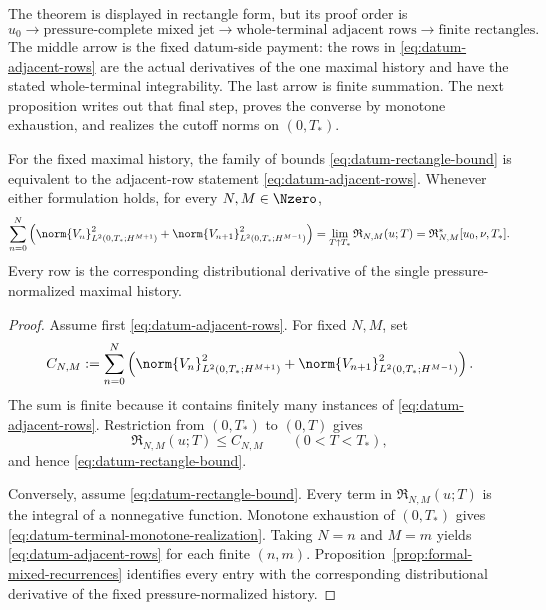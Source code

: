 The theorem is displayed in rectangle form, but its proof order is
\[
 u_0
 \longrightarrow \text{pressure-complete mixed jet}
 \longrightarrow \text{whole-terminal adjacent rows}
 \longrightarrow \text{finite rectangles}.
\]
The middle arrow is the fixed datum-side payment: the rows in
\eqref{eq:datum-adjacent-rows} are the actual derivatives of the one maximal
history and have the stated whole-terminal integrability.  The last arrow is
finite summation.  The next proposition writes out that final step, proves the
converse by monotone exhaustion, and realizes the cutoff norms on \((0,T_*)\).

\begin{proposition}
\label{prop:datum-terminal-realization}
For the fixed maximal history, the family of bounds
\eqref{eq:datum-rectangle-bound} is equivalent to the adjacent-row statement
\eqref{eq:datum-adjacent-rows}.  Whenever either formulation holds, for every
\(N,M\in\Nzero\),
\begin{equation}
 \sum_{n=0}^{N}\left(
 \norm{V_n}_{L^2(0,T_*;H^{M+1})}^2
 +\norm{V_{n+1}}_{L^2(0,T_*;H^{M-1})}^2
 \right)
 =\lim_{T\uparrow T_*}\mathfrak R_{N,M}(u;T)
 =\mathfrak R_{N,M}^*[u_0,\nu,T_*].
 \label{eq:datum-terminal-monotone-realization}
\end{equation}
Every row is the corresponding distributional derivative of the single
pressure-normalized maximal history.
\end{proposition}

\begin{proof}
Assume first \eqref{eq:datum-adjacent-rows}.  For fixed \(N,M\), set
\[
 C_{N,M}:=
 \sum_{n=0}^{N}\left(
  \norm{V_n}_{L^2(0,T_*;H^{M+1})}^2
  +\norm{V_{n+1}}_{L^2(0,T_*;H^{M-1})}^2
 \right).
\]
The sum is finite because it contains finitely many instances of
\eqref{eq:datum-adjacent-rows}.  Restriction from \((0,T_*)\) to \((0,T)\)
gives
\[
 \mathfrak R_{N,M}(u;T)\le C_{N,M}
 \qquad(0<T<T_*),
\]
and hence \eqref{eq:datum-rectangle-bound}.

Conversely, assume \eqref{eq:datum-rectangle-bound}.  Every term in
\(\mathfrak R_{N,M}(u;T)\) is the integral of a nonnegative function.
Monotone exhaustion of \((0,T_*)\) gives
\eqref{eq:datum-terminal-monotone-realization}.  Taking \(N=n\) and \(M=m\)
yields \eqref{eq:datum-adjacent-rows} for each finite \((n,m)\).
Proposition~\ref{prop:formal-mixed-recurrences} identifies every entry with
the corresponding distributional derivative of the fixed pressure-normalized
history.
\end{proof}

